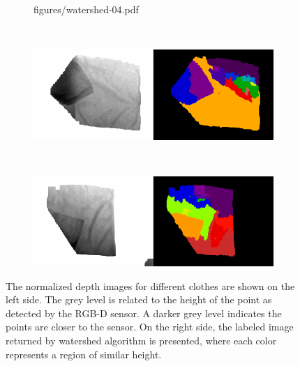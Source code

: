 \begin{figure}[htbp]
\begin{subfigure}[c]{0.7\textwidth}
    	{figures/watershed-04.pdf}
	\end{subfigure}
	~
	\begin{subfigure}[c]{0.7\textwidth}
	    \centering
    	\includegraphics[width=\textwidth]
    	{figures/watershed-05.pdf}
	\end{subfigure}
	~
    \begin{subfigure}[c]{0.7\textwidth}
	    \centering
    	\includegraphics[width=\textwidth]
    	{figures/watershed-06.pdf}
	\end{subfigure} 
    \caption{The normalized depth images for different clothes are shown on the left side. The grey level is related to the height of the point as detected by the RGB-D sensor. A darker grey level indicates the points are closer to the sensor. On the right side, the labeled image returned by watershed algorithm is presented, where each color represents a region of similar height.}
    \label{fig:watershed_labels}
\end{figure}


